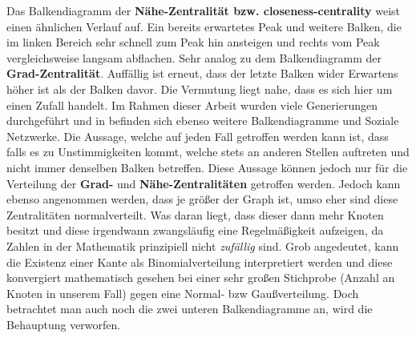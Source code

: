 Das Balkendiagramm der \textbf{Nähe-Zentralität bzw. closeness-centrality} weist einen ähnlichen Verlauf auf. Ein bereits erwartetes Peak und weitere Balken, die im linken Bereich sehr schnell zum Peak hin ansteigen und rechts vom Peak vergleichsweise langsam abflachen. Sehr analog zu dem Balkendiagramm der \textbf{Grad-Zentralität}. Auffällig ist erneut, dass der letzte Balken wider Erwartens höher ist als der Balken davor. Die Vermutung liegt nahe, dass es sich hier um einen Zufall handelt. Im Rahmen dieser Arbeit wurden viele Generierungen durchgeführt und in \cite{TZ} befinden sich ebenso weitere Balkendiagramme und Soziale Netzwerke. Die Aussage, welche auf jeden Fall getroffen werden kann ist, dass falls es zu Unstimmigkeiten kommt, welche stets an anderen Stellen auftreten und nicht immer denselben Balken betreffen. Diese Aussage können jedoch nur für die Verteilung der \textbf{Grad-} und \textbf{Nähe-Zentralitäten} getroffen werden. Jedoch kann ebenso angenommen werden, dass je größer der Graph ist, umso eher sind diese Zentralitäten normalverteilt. Was daran liegt, dass dieser dann mehr Knoten besitzt und diese irgendwann zwangsläufig eine Regelmäßigkeit aufzeigen, da Zahlen in der Mathematik prinzipiell nicht \textit{zufällig} sind. Grob angedeutet, kann die Existenz einer Kante als Binomialverteilung interpretiert werden und diese konvergiert mathematisch gesehen bei einer sehr großen Stichprobe (Anzahl an Knoten in unserem Fall) gegen eine Normal- bzw Gaußverteilung.
Doch betrachtet man auch noch die zwei unteren Balkendiagramme an, wird die Behauptung verworfen. \\

